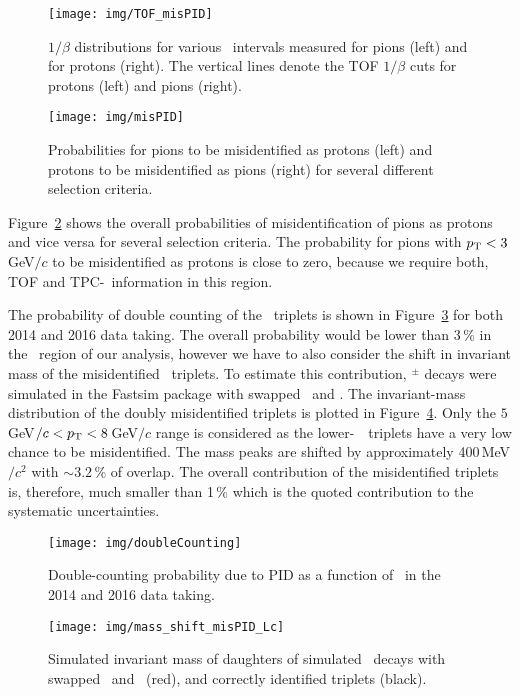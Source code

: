 \begin{figure}[!htb]
\centering
\texttt{[image: img/TOF\_misPID]}
\caption{\label{TOF_misPID} $1/\beta$ distributions for various \pt\ intervals measured for pions (left) and for protons (right)\@. The vertical lines denote the TOF $1/\beta$ cuts for protons (left) and pions (right).}
\end{figure}

\begin{figure}[!htb]
\centering
\texttt{[image: img/misPID]}
\caption{\label{misPID} Probabilities for pions to be misidentified as protons (left) and protons to be misidentified as pions (right) for several different selection criteria. }
\end{figure}

Figure~\ref{misPID} shows the overall probabilities of misidentification of pions as protons and vice versa for several selection criteria. The probability for pions with ${p_{\mathrm{T}}} < 3\,$GeV$/c$ to be misidentified as protons is close to zero, because we require both, TOF and TPC-\dedx\ information in this region.

The probability of double counting of the \Lambdac\ triplets is shown in Figure~\ref{doubleCounting} for both 2014 and 2016 data taking. The overall probability would be lower than 3$\,\%$ in the \pt\ region of our analysis, however we have to also consider the shift in invariant mass of the misidentified \pKpi\ triplets. To estimate this contribution, \Lambdac$^\pm$ decays were simulated in the Fastsim package with swapped \pipm\ and \ppm. The invariant-mass distribution of the doubly misidentified triplets is plotted in Figure~\ref{misPID_Lc}\@. Only the $5\,$GeV$/c < {p_{\mathrm{T}}} < 8\,$GeV$/c$ range is considered as the lower-\pt\ \Lambdac\ triplets have a very low chance to be misidentified. The mass peaks are shifted by approximately 400$\,$MeV$/c^2$ with $\sim 3.2\,\%$ of overlap. The overall contribution of the misidentified triplets is, therefore, much smaller than 1$\,\%$ which is the quoted contribution to the systematic uncertainties.

\begin{figure}[!htb]
\centering
\texttt{[image: img/doubleCounting]}
\caption{\label{doubleCounting} Double-counting probability due to PID as a function of \pt\ in the 2014 and 2016 data taking.}
\end{figure}


\begin{figure}[!htb]
\centering
\texttt{[image: img/mass\_shift\_misPID\_Lc]}
\caption{\label{misPID_Lc} Simulated invariant mass of daughters of simulated \Lambdac\ decays with swapped \pipm\ and \ppm\ (red), and correctly identified triplets (black). }
\end{figure}


